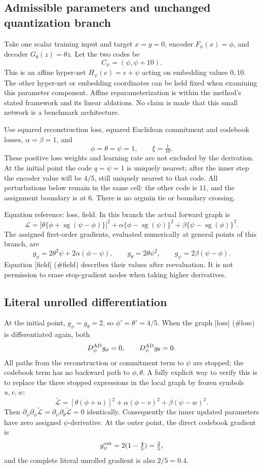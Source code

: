 \documentclass[10pt]{article}
\begin{document}
\subsection*{Admissible parameters and unchanged quantization branch}
Take one scalar training input and target \(x=y=0\), encoder \(F_\phi(x)=\phi\), and decoder \(G_\theta(z)=\theta z\). Let the two codes be \[C_\psi=(\psi,\psi+10).\] This is an affine hyper-net \(H_\psi(e)=e+\psi\) acting on embedding values \(0,10\). The other hyper-net or embedding coordinates can be held fixed when examining this parameter component. Affine reparameterization is within the method’s stated framework and its linear ablations. No claim is made that this small network is a benchmark architecture.\par
Use squared reconstruction loss, squared Euclidean commitment and codebook losses, \(\alpha=\beta=1\), and \[\phi=\theta=\psi=1,\qquad \xi=\tfrac1{10}.\] These positive loss weights and learning rate are not excluded by the derivation. At the initial point the code \(q=\psi=1\) is uniquely nearest; after the inner step the encoder value will be \(4/5\), still uniquely nearest to that code. All perturbations below remain in the same cell: the other code is \(11\), and the assignment boundary is at \(6\). There is no argmin tie or boundary crossing.\par
Equation reference: loss, field. In this branch the actual forward graph is \[
 \mathcal L=
  \bigl[\theta\{\phi+\operatorname{sg}(\psi-\phi)\}\bigr]^2
 +\alpha\{\phi-\operatorname{sg}(\psi)\}^2
 +\beta\{\psi-\operatorname{sg}(\phi)\}^2 .\] The assigned first-order gradients, evaluated numerically at general points of this branch, are \[
 g_\phi=2\theta^2\psi+2\alpha(\phi-\psi),\qquad
 g_\theta=2\theta\psi^2,\qquad
 g_\psi=2\beta(\psi-\phi).\] Equation [field] (\#field) describes their values after reevaluation. It is not permission to erase stop-gradient nodes when taking higher derivatives.\par
\subsection*{Literal unrolled differentiation}
At the initial point, \(g_\phi=g_\theta=2\), so \(\phi'=\theta'=4/5\). When the graph [loss] (\#loss) is differentiated again, both \[D_\psi^{\rm AD}g_\phi=0,\qquad D_\psi^{\rm AD}g_\theta=0.\] All paths from the reconstruction or commitment term to \(\psi\) are stopped; the codebook term has no backward path to \(\phi,\theta\). A fully explicit way to verify this is to replace the three stopped expressions in the local graph by frozen symbols \(u,v,w\): \[\widetilde{\mathcal L}
   =[\theta(\phi+u)]^2+\alpha(\phi-v)^2+\beta(\psi-w)^2.\] Then \(\partial_\psi\partial_\phi\widetilde{\mathcal L}
=\partial_\psi\partial_\theta\widetilde{\mathcal L}=0\) identically. Consequently the inner updated parameters have zero assigned \(\psi\)-derivative. At the outer point, the direct codebook gradient is \[g_\psi^{\rm out}=2(1-\tfrac45)=\tfrac25,\] and the complete literal unrolled gradient is also \(\boxed{2/5=0.4}\).\par
\end{document}
